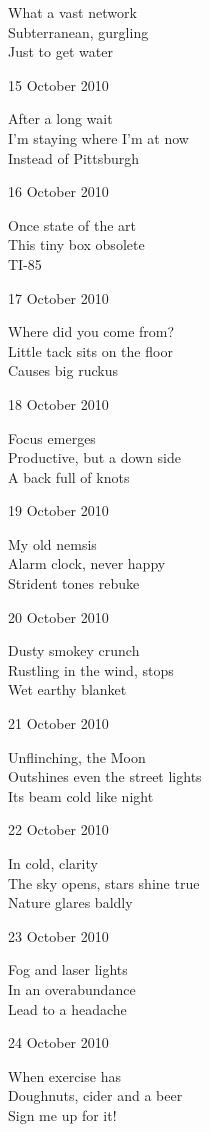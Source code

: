 \documentclass[12pt]{article}
\begin{document}
What a vast network \\
Subterranean, gurgling \\
Just to get water

15 October 2010

After a long wait \\
I'm staying where I'm at now \\
Instead of Pittsburgh

16 October 2010

Once state of the art \\
This tiny box obsolete \\
TI-85

17 October 2010

Where did you come from? \\
Little tack sits on the floor \\
Causes big ruckus


\newpage

18 October 2010

Focus emerges \\
Productive, but a down side \\
A back full of knots

19 October 2010

My old nemsis \\
Alarm clock, never happy \\
Strident tones rebuke

20 October 2010

Dusty smokey crunch \\
Rustling in the wind, stops \\
Wet earthy blanket

21 October 2010

Unflinching, the Moon \\
Outshines even the street lights \\
Its beam cold like night

22 October 2010

In cold, clarity \\
The sky opens, stars shine true \\
Nature glares baldly

23 October 2010

Fog and laser lights \\
In an overabundance \\
Lead to a headache

24 October 2010

When exercise has \\
Doughnuts, cider and a beer \\
Sign me up for it!
\end{document}
